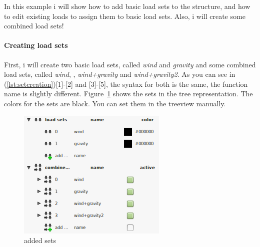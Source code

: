 In this example i will show how to add basic load sets to the structure, and how to edit existing loads to assign them to basic load sets. Also, i will create some combined load sets!
\vspace{20pt}\\
\begin{minipage}[h]{\textwidth-8cm}
\paragraph{Creating load sets} First, i will create two basic load sets, called \textit{wind} and \textit{gravity} and some combined load sets, called \textit{wind}, , \textit{wind+gravity} and \textit{wind+gravity2}. As you can see in (\ref{lst:setcreation})[1]-[2] and [3]-[5], the syntax for both is the same, the function name is slightly different. Figure~\ref{pic:scriptset} shows the sets in the tree representation. The colors for the sets are black. You can set them in the treeview manually.
\end{minipage}
\hfill
\begin{minipage}[h]{8cm}
\begin{figure}[H]
\begin{center}
\includegraphics[width=\textwidth-1cm]{../pictures/scriptset.png}
\caption{added sets}
\label{pic:scriptset}
\end{center}
\end{figure}
\end{minipage}
